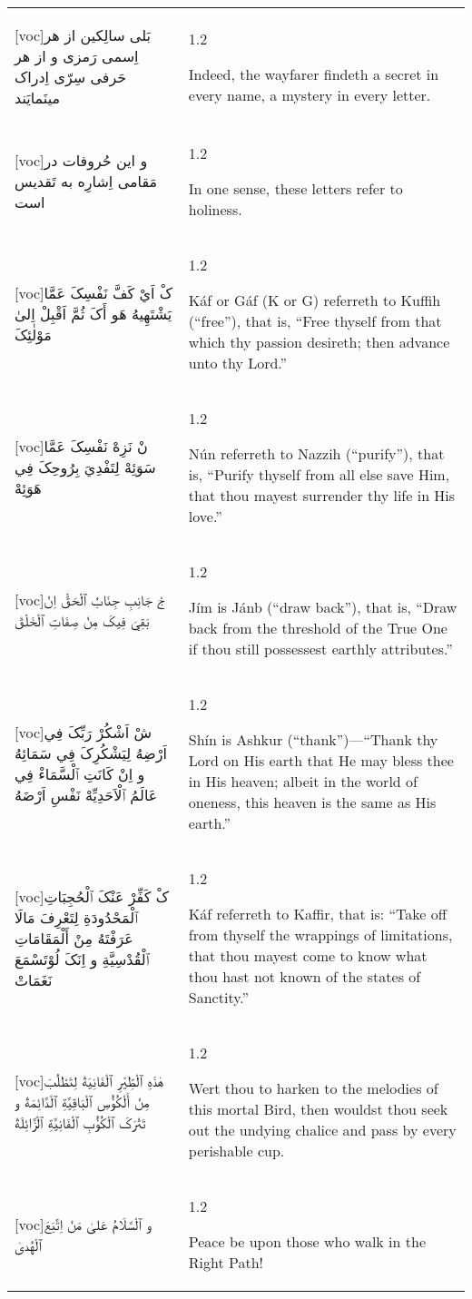 \documentclass[11pt]{article}
\makeatletter
\newenvironment{orig}
  {\begin{farsi}[voc]}
  {\end{farsi}}
\newenvironment{trans}
  {\large\begin{spacing}{1.2}\raggedright}
  {\end{spacing}}
\newenvironment{word}
  {\begin{longtable}[t]{p{3in}@{\hspace{3em}}p{2.5in}}}
  {\end{longtable}}
\newcommand{\ayat}[2]{
  \begin{orig}#1\end{orig} &
  \vspace{1.5ex}\begin{trans}#2\end{trans} \vspace{-2ex}\\
}
\makeatother
\begin{document}
\begin{word}
\ayat{بَلی سالِکين از هر اِسمی رَمزی و از هر حَرفی سِرّی اِدراک مينَمايَند}
     {Indeed, the wayfarer findeth a secret in every name, a mystery in every
      letter.}

\ayat{و اين حُروفات در مَقامی اِشارِه به تَقديس است}
     {In one sense, these letters refer to holiness.}

\ayat{کْ اَيْ کَفَّ نَفْسِکَ عَمَّا يَشْتَهِيهُ هَو أَکَ ثُمَّ اَقْبِلْ اِلىٰ مَوْلٰئِکَ}
     {Káf or Gáf (K or G) referreth to Kuffih (“free”), that is, “Free thyself
      from that which thy passion desireth; then advance unto thy Lord.”}

\ayat{نْ نَزِهْ نَفْسِکَ عَمَّا سَوَئِهْ لِتَفْدِيَ بِرُوحِکَ فِي هَوَئِهْ}
     {Nún referreth to Nazzih (“purify”), that is, “Purify thyself from all
      else save Him, that thou mayest surrender thy life in His love.”}

\ayat{جْ جَانِبِ جِنَابُ ٱلْحَقّْ اِنْ بَقِيَ فِيکَ مِنْ صِفَاتِ ٱلْخَلْقْ}
     {Jím is Jánb (“draw back”), that is, “Draw back from the threshold of the
      True One if thou still possessest earthly attributes.”}

\ayat{شْ اَشْکُرْ رَبِّکَ فِي اَرْضِهُ لِيَشْکُرِکَ فِي سَمَائِهُ و اِنْ کَانَتِ ٱلْسَّمَاءْ فِي عَالَمُ ٱلْاَحَدِيِّهْ نَفْسِ اَرْضَهُ}
     {Shín is Ashkur (“thank”)—“Thank thy Lord on His earth that He may bless
      thee in His heaven; albeit in the world of oneness, this heaven is the
      same as His earth.”}

\ayat{کْ کَفِّرْ عَنْکَ ٱلْحُجِبَاتِ ٱلْمَحْدُودَةِ لِتَعْرِفَ مَالَا عَرَفْتَهُ مِنْ أَلْمَقَامَاتِ ٱلْقُدْسِيَّةِ و اِنَکَ لُوْتَسْمَعَ نَغَمَاتْ}
     {Káf referreth to Kaffir, that is: “Take off from thyself the wrappings
      of limitations, that thou mayest come to know what thou hast not known
      of the states of Sanctity.”}

\ayat{هٰذَهِ ٱلْطِّيْرِ ٱلْفَانِيَةْ لِتَطْلُبَ مِنْ أَلْکُؤُسِ ٱلْبَاقِيَّةِ ٱلْدَّائِمَةْ و تَتْرَکَ ٱلْکُؤُبِ ٱلْفَانِيَّةِ ٱلْزَّائِلَةْ}
     {Wert thou to harken to the melodies of this mortal Bird, then wouldst
      thou seek out the undying chalice and pass by every perishable cup.}

\ayat{و ٱلْسَّلَامُ عَلىٰ مَنْ اِتَّبَعَ ٱلْهُدىٰ}
     {Peace be upon those who walk in the Right Path!}
\end{word}
\end{document}
